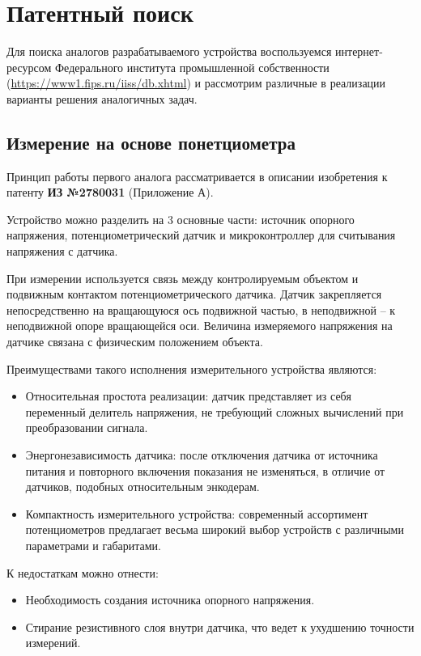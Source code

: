 \section{Патентный поиск}
\label{sec:patent}
Для поиска аналогов разрабатываемого устройства воспользуемся интернет-ресурсом Федерального института промышленной собственности (\href{https://www1.fips.ru/iiss/db.xhtml}{https://www1.fips.ru/iiss/db.xhtml}) и рассмотрим различные в реализации варианты решения аналогичных задач.
\subsection{Измерение на основе понетциометра}

Принцип работы первого аналога рассматривается в описании изобретения к патенту \textbf{ИЗ №2780031} (Приложение А).

Устройство можно разделить на 3 основные части: источник опорного напряжения, потенциометрический датчик и микроконтроллер для считывания напряжения с датчика.

При измерении используется связь между контролируемым объектом и подвижным контактом потенциометрического датчика.
Датчик закрепляется непосредственно на вращающуюся ось подвижной частью, в неподвижной -- к неподвижной опоре вращающейся оси.
Величина измеряемого напряжения на датчике связана с физическим положением объекта.

Преимуществами такого исполнения измерительного устройства являются:
\begin{itemize}
    \item Относительная простота реализации: датчик представляет из себя переменный делитель напряжения, не требующий сложных вычислений при преобразовании сигнала.
    \item Энергонезависимость датчика: после отключения датчика от источника питания и повторного включения показания не изменяться, в отличие от датчиков, подобных относительным энкодерам.
    \item Компактность измерительного устройства: современный ассортимент потенциометров предлагает весьма широкий выбор устройств с различными параметрами и габаритами.
\end{itemize}

К недостаткам можно отнести:
\begin{itemize}
    \item Необходимость создания источника опорного напряжения.
    \item Стирание резистивного слоя внутри датчика, что ведет к ухудшению точности измерений.
\end{itemize}

